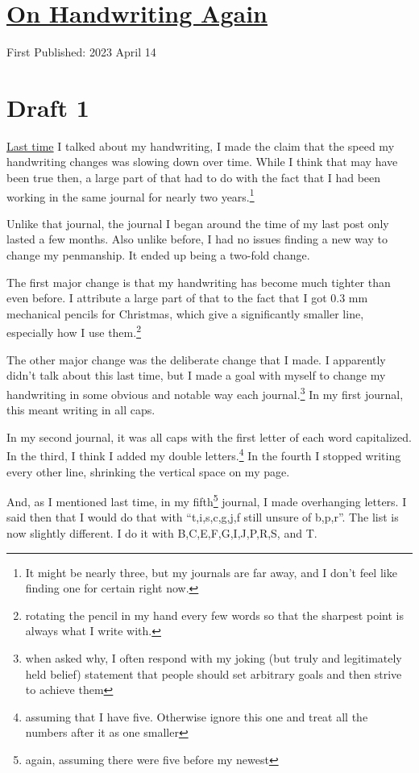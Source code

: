 \documentclass[12pt]{article}[titlepage]
\newcommand{\say}[1]{``#1''}
\newcommand{\1}{\={a}}
\newcommand{\2}{\={e}}
\newcommand{\3}{\={\i}}
\newcommand{\4}{\=o}
\newcommand{\5}{\=u}
\newcommand{\6}{\={A}}
\renewcommand{\,}{\textsuperscript{,}}
\begin{document}
\doublespacing
\section{\href{handwriting-2.html}{On Handwriting Again}}
First Published: 2023 April 14

\section{Draft 1}
\href{handwriting.html}{Last time} I talked about my handwriting, I made the claim that the speed my handwriting changes was slowing down over time.
While I think that may have been true then, a large part of that had to do with the fact that I had been working in the same journal for nearly two years.\footnote{It might be nearly three, but my journals are far away, and I don't feel like finding one for certain right now.}

Unlike that journal, the journal I began around the time of my last post only lasted a few months.
Also unlike before, I had no issues finding a new way to change my penmanship.
It ended up being a two-fold change.

The first major change is that my handwriting has become much tighter than even before.
I attribute a large part of that to the fact that I got 0.3 mm mechanical pencils for Christmas, which give a significantly smaller line, especially how I use them.\footnote{rotating the pencil in my hand every few words so that the sharpest point is always what I write with.}

The other major change was the deliberate change that I made.
I apparently didn't talk about this last time, but I made a goal with myself to change my handwriting in some obvious and notable way each journal.\footnote{when asked why, I often respond with my joking (but truly and legitimately held belief) statement that people should set arbitrary goals and then strive to achieve them}
In my first journal, this meant writing in all caps.

In my second journal, it was all caps with the first letter of each word capitalized.
In the third, I think I added my double letters.\footnote{assuming that I have five. Otherwise ignore this one and treat all the numbers after it as one smaller}
In the fourth I stopped writing every other line, shrinking the vertical space on my page.

And, as I mentioned last time, in my fifth\footnote{again, assuming there were five before my newest} journal, I made overhanging letters.
I said then that I would do that with \say{t,i,s,c,g,j,f still unsure of b,p,r}.
The list is now slightly different.
I do it with B,C,E,F,G,I,J,P,R,S, and T.
\end{document}
